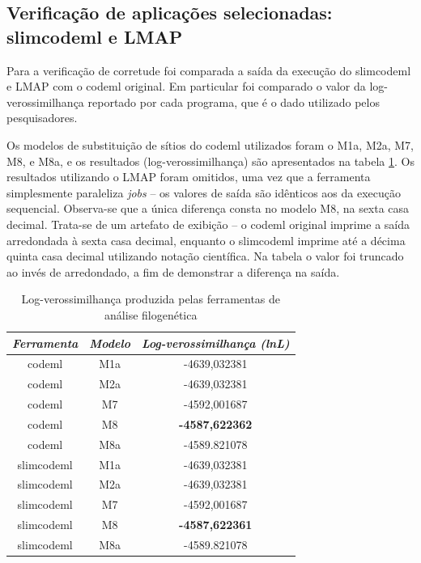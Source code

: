 \documentclass[cic,tc]{iiufrgs}
\begin{document}
\subsection{Verificação de aplicações selecionadas: slimcodeml e LMAP}

Para a verificação de corretude foi comparada a saída da execução do slimcodeml
e LMAP com o codeml original. Em particular foi comparado o valor da
log-verossimilhança reportado por cada programa, que é o dado utilizado pelos
pesquisadores.

Os modelos de substituição de sítios do codeml utilizados foram o M1a, M2a, M7,
M8, e M8a, e os resultados (log-verossimilhança) são apresentados na tabela
\ref{tbl:log}. Os resultados utilizando o LMAP foram omitidos, uma vez que a
ferramenta simplesmente paraleliza \textit{jobs} -- os valores de saída são
idênticos aos da execução sequencial. Observa-se que a única diferença consta
no modelo M8, na sexta casa decimal. Trata-se de um artefato de exibição -- o
codeml original imprime a saída arredondada à sexta casa decimal, enquanto o
slimcodeml imprime até a décima quinta casa decimal utilizando notação
científica. Na tabela o valor foi truncado ao invés de arredondado, a fim de
demonstrar a diferença na saída.

\begin{table}[h]
    \caption{Log-verossimilhança produzida pelas ferramentas de análise filogenética}
    \centering
        \begin{tabular}{c|c|c}
          \hline
          \textit{Ferramenta}  &   \textit{Modelo} & \textit{Log-verossimilhança (lnL)} \\
          \hline
          \hline
          codeml            & M1a & -4639,032381 \\
          codeml            & M2a & -4639,032381 \\
          codeml            & M7  & -4592,001687 \\
          codeml            & M8  & \textbf{-4587,622362} \\
          codeml            & M8a & -4589.821078 \\
          slimcodeml        & M1a & -4639,032381 \\
          slimcodeml        & M2a & -4639,032381 \\
          slimcodeml        & M7  & -4592,001687 \\
          slimcodeml        & M8  & \textbf{-4587,622361} \\
          slimcodeml        & M8a & -4589.821078 \\
          \hline
        \end{tabular}
    \label{tbl:log}
\end{table}
\end{document}
